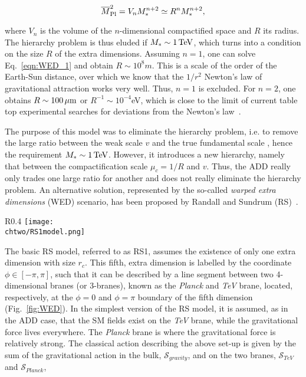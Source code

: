 \begin{equation}\label{eqn:WED_1}
\overline{M}_\mathrm{Pl}^2 = V_nM^{n+2}_* \simeq R^nM^{n+2}_*,
\end{equation}

\noindent where $V_n$ is the volume of the $n$-dimensional compactified space and $R$ its radius.
The hierarchy problem is thus eluded if $M_* \sim 1\,\text{Te\hspace{-.08em}V}$, which turns into a condition on the size $R$ of the extra dimensions.
Assuming $n = 1$, one can solve Eq.~\ref{eqn:WED_1} and obtain $R \sim 10^8\unit{m}$.
This is a scale of the order of the Earth-Sun distance, over which we know that the $1/r^2$ Newton's law of gravitational attraction works very well. Thus, $n = 1$ is excluded.
For $n = 2$, one obtains $R \sim 100\,\mu\text{m}$ or $R^{-1} \sim 10^{-4}$\unit{eV}, which is close to the limit of current table top experimental searches for deviations from the Newton's law~\cite{Hoyle:2004cw}. 

The purpose of this model was to eliminate the hierarchy problem, i.e. to remove the large ratio between the weak scale $v$ and the true fundamental scale \bMPl, hence the requirement $M_* \sim 1\,\text{Te\hspace{-.08em}V}$.
However, it introduces a new hierarchy, namely that between the compactification scale $\mu_c = 1/R$ and $v$.
Thus, the ADD really only trades one large ratio for another and does not really eliminate the hierarchy problem.
An alternative solution, represented by the so-called \textit{warped extra dimensions} (WED) scenario, has been proposed by Randall and Sundrum (RS)~\cite{Randall:1999ee}.

\begin{wrapfigure}{R}{0.4\textwidth}
 \centering
 \texttt{[image: \\chtwo/RS1model.png]}
 \caption{Set-up of the five dimensions in the RS model. The \textit{Planck} and \textit{TeV} branes are the 4-dimensional boundaries of the extra dimension $\phi$ compactified in an interval $[0,\pi]$.}
 \label{fig:WED}
\end{wrapfigure}

The basic RS model, referred to as RS1, assumes the existence of only one extra dimension with size $r_c$. This fifth, extra dimension is labelled by the coordinate $\phi \in [-\pi,\pi]$,
such that it can be described by a line segment between two 4-dimensional branes (or 3-branes), known as the \textit{Planck} and \textit{TeV} brane, located, respectively,
at the $\phi = 0$ and $\phi = \pi$ boundary of the fifth dimension (Fig.~\ref{fig:WED}).
In the simplest version of the RS model, it is assumed, as in the ADD case, that the SM fields exist on the \textit{TeV} brane, while the gravitational force lives everywhere.
The \textit{Planck} brane is where the gravitational force is relatively strong.
The classical action describing the above set-up is given by the sum of the gravitational action in the bulk, $\mathcal{S}_{gravity}$, and on the two branes, $\mathcal{S}_{TeV}$ and $\mathcal{S}_{Planck}$,

